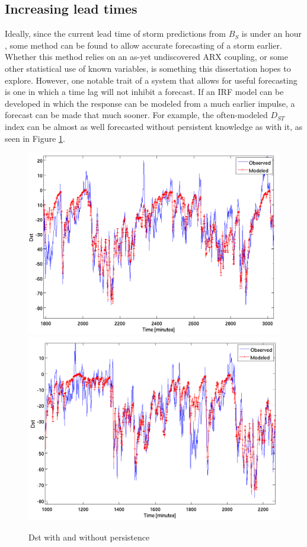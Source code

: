 \documentclass[10pt]{article}
\begin{document}
\subsection{Increasing lead times}
Ideally, since the current lead time of storm predictions from $B_S$ is under an hour \citep{StatCompStorms}, some method can be found to allow accurate forecasting of a storm earlier. Whether this method relies on an as-yet undiscovered ARX coupling, or some other statistical use of known variables, is something this dissertation hopes to explore. However, one notable trait of a system that allows for useful forecasting is one in which a time lag will not inhibit a forecast. If an IRF model can be developed in which the response can be modeled from a much earlier impulse, a forecast can be made that much sooner. For example, the often-modeled $D_{ST}$ index can be almost as well forecasted without persistent knowledge as with it, as seen in Figure \ref{DST}.

\begin{figure}[h!]
\centering
\includegraphics[scale=0.25]{DstExample.png}
\includegraphics[scale=0.25]{DstNoPersist.png}
\caption{Dst with and without persistence}
\label{DST}
\end{figure}
\end{document}
